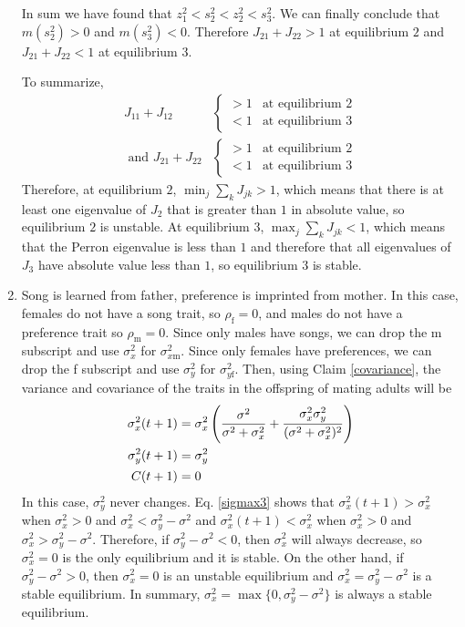 \documentclass{article}
\newcommand{\x}[1]{\text{#1}}
\begin{document}
\begin{enumerate}
In sum we have found that $z_1^2<s_2^2<z_2^2<s_3^2$. We can finally conclude that $m(s_2^2)>0$ and $m(s_3^2)<0$. Therefore $J_{21}+J_{22}>1$ at equilibrium $2$ and $J_{21}+J_{22}<1$ at equilibrium $3$. 

To summarize,
\begin{align*}
J_{11}+J_{12}&\left\{\begin{array}{cc}>1 & \text{at equilibrium $2$}
\\<1 & \text{at equilibrium $3$}
 \end{array}\right.
 \\\text{ and }J_{21}+J_{22}&\left\{\begin{array}{cc}>1 & \text{at equilibrium $2$}
\\<1 & \text{at equilibrium $3$}
 \end{array}\right.
\end{align*}
Therefore, at equilibrium $2$, $\min_j\sum_k J_{jk}>1$, which means that there is at least one eigenvalue of $J_2$ that is greater than $1$ in absolute value, so equilibrium $2$ is unstable. At equilibrium $3$, $\max_j\sum_k J_{jk}<1$, which means that the Perron eigenvalue is less than $1$ and therefore that all eigenvalues of $J_3$ have absolute value less than $1$, so equilibrium $3$ is stable.

\item Song is learned from father, preference is imprinted from mother. In this case, females do not have a song trait, so $\rho_\x{f}=0$, and males do not have a preference trait so $\rho_\x{m}=0$. Since only males have songs, we can drop the m subscript and use  $\sigma_x^2$ for $\sigma_{x\x{m}}^2$. Since only females have preferences, we can drop the f subscript and use $\sigma_y^2$ for $\sigma_{y\x{f}}^2$. Then, using Claim \ref{covariance}, the variance and covariance of the traits in the offspring of mating adults will be 
\begin{align}
\sigma_x^2(t+1)&=\sigma_x^2\left(\frac{\sigma^2}{\sigma^2+\sigma_x^2}+\frac{\sigma_x^2\sigma_y^2}{(\sigma^2+\sigma_x^2)^2}\right) \label{sigmax3}
\\ \sigma_y^2(t+1)&=\sigma_y^2 \notag %
\\ C(t+1)&=0 \notag
\end{align}
In this case, $\sigma_y^2$ never changes. Eq. \ref{sigmax3} shows that $\sigma_x^2(t+1)>\sigma_x^2$ when $\sigma_x^2>0$ and $\sigma_x^2<\sigma_y^2-\sigma^2$ and $\sigma_x^2(t+1)<\sigma_x^2$ when $\sigma_x^2>0$ and $\sigma_x^2>\sigma_y^2-\sigma^2$. Therefore, if $\sigma_y^2-\sigma^2<0$, then $\sigma_x^2$ will always decrease, so $\sigma_x^2=0$ is the only equilibrium and it is stable. On the other hand, if $\sigma_y^2-\sigma^2>0$, then $\sigma_x^2=0$ is an unstable equilibrium and $\sigma_x^2=\sigma_y^2-\sigma^2$ is a stable equilibrium. In summary, $\sigma_x^2=\max\{0,\sigma_y^2-\sigma^2\}$ is always a stable equilibrium.


\end{enumerate}
\end{document}
